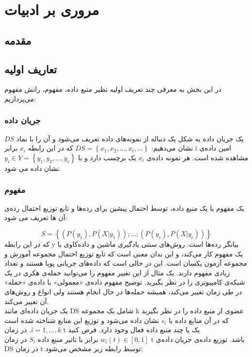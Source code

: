 
\chapter{مروری بر ادبیات}
\thispagestyle{empty}
\section{مقدمه}


\section{تعاریف اولیه}\label{sec2}
در این بخش به معرفی چند تعریف اولیه نظیر منبع داده، مفهوم، رانش مفهوم می‌پردازیم:
\subsection{جریان داده}
یک جریان داده یه شکل یک دنباله از نمونه‌های داده تعریف می‌شود و آن را با نماد $DS$ نشان می‌دهیم:
$DS = \left\{ x_1, x_2, ..., x_t, ...\right\}$
که در این رابطه $x_i$ برابر i امین داده‌ی مشاهده شده است. هر نمونه داده‌ی $x_i$ یک برچسب دارد و با  $ y_i \in Y = \left\{y_1, y_2, ..., y_c\right\} $ نشان داده می شود.


\subsection{مفهوم}
یک مفهوم یا یک منبع داده، توسط احتمال پیشین برای رده‌ها و تابع توزیع احتمال رده‌‌ی آن ها تعریف می شود:

\begin{equation}
S = \left\{(P(y_1), P(X|y_1));...;(P(y_c), P(X|y_c))\right\} 
\end{equation}
که در این رابطه y بیانگر رده‌ها است. روش‌های سنتی یادگیری ماشین و داده‌کاوی با یک مفهوم کار می‌کند، و این بدان معنی است که تابع توزیع احتمال مجموعه آموزش و مجموعه آزمون یکسان است. این در حالی است که داده‌های جریانی پویا هستند و تعداد زیادی مفهوم دارند. یک مثال از این تغییر مفهوم را می‌توانید حمله‌ی هکری در یک شبکه‌ی کامپیوتری را در نظر بگیرید. توضیح مفهوم داده‌ی «معمولی» با داده‌ی «حمله» در طی زمان تغییر می‌کند، همیشه حمله‌ها در حال انجام هستند ولی انواع و روش‌های آن تغییر می‌کند.
\\
یک جریان داده‌ای مانند DS شامل یک مجموعه k عضوی از منبع داده را در نظر بگیرید که در آن منابع داده با $s_i$ نشان‌ داده می‌شود و توزیع این منابع شناخته شده است $ i = 1, ..., k $. در زمان t یک یا چند منبع داده فعال وجود دارد. فرض کنید $w_i(t) \in [0, 1]$ برابر با تاثیر منبع داده  $S_i$ در زمان t باشد. توزیع داده‌ی جریان داده‌ی DS در زمان t توسط رابطه زیر مشخص می‌شود:


